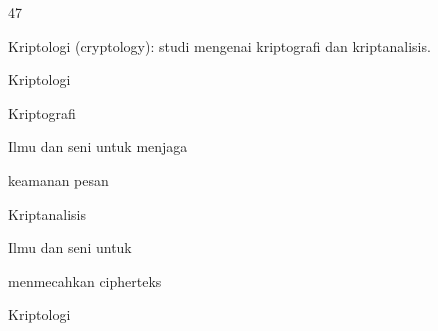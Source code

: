 \documentclass{article}
\begin{document}

47

Kriptologi (cryptology): studi mengenai kriptografi dan kriptanalisis.


Kriptologi

Kriptografi

Ilmu dan seni untuk menjaga

keamanan pesan

Kriptanalisis

Ilmu dan seni untuk

menmecahkan cipherteks

Kriptologi
\end{document}
